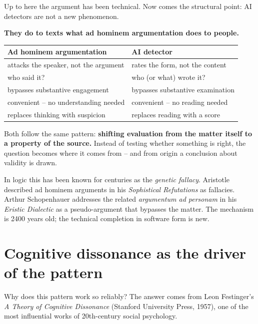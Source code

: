 Up to here the argument has been technical. Now comes the structural
point: AI detectors are not a new phenomenon.

\textbf{They do to texts what ad hominem argumentation does to
people.}

\begin{center}
\renewcommand{\arraystretch}{1.3}
{\small
\begin{tabular}{>{\raggedright\arraybackslash}p{5.0cm}>{\raggedright\arraybackslash}p{5.6cm}}
\toprule
\textbf{Ad hominem argumentation} & \textbf{AI detector} \\
\midrule
attacks the speaker, not the argument & rates the form, not the content \\[2pt]
who said it? & who (or what) wrote it? \\[2pt]
bypasses substantive engagement & bypasses substantive examination \\[2pt]
convenient -- no understanding needed & convenient -- no reading needed \\[2pt]
replaces thinking with suspicion & replaces reading with a score \\
\bottomrule
\end{tabular}
}
\renewcommand{\arraystretch}{1.0}
\end{center}

Both follow the same pattern: \textbf{shifting evaluation from the
matter itself to a property of the source.} Instead of testing
whether something is right, the question becomes where it comes
from -- and from origin a conclusion about validity is drawn.

In logic this has been known for centuries as the \emph{genetic
fallacy}. Aristotle described ad hominem arguments in his
\emph{Sophistical Refutations} as fallacies. Arthur Schopenhauer
addresses the related \emph{argumentum ad personam} in his
\emph{Eristic Dialectic} as a pseudo-argument that bypasses the
matter. The mechanism is 2400 years old; the technical completion
in software form is new.

\section{Cognitive dissonance as the driver of the pattern}

Why does this pattern work so reliably? The answer comes from Leon
Festinger's \emph{A Theory of Cognitive Dissonance} (Stanford
University Press, 1957), one of the most influential works of
20th-century social psychology.

